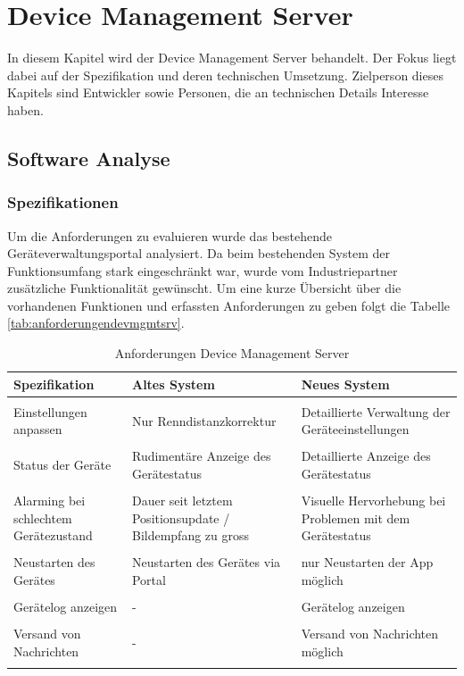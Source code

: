 \chapter{Device Management Server}
\label{sec:devmgmtsrv}
In diesem Kapitel wird der Device Management Server behandelt. Der Fokus liegt dabei auf der Spezifikation und deren technischen Umsetzung. Zielperson dieses Kapitels sind Entwickler sowie Personen, die an technischen Details Interesse haben.

\section{Software Analyse}

\subsection{Spezifikationen}
Um die Anforderungen zu evaluieren wurde das bestehende Geräteverwaltungsportal analysiert. Da beim bestehenden System der Funktionsumfang stark eingeschränkt war, wurde vom Industriepartner zusätzliche Funktionalität gewünscht.
Um eine kurze Übersicht über die vorhandenen Funktionen und erfassten Anforderungen zu geben folgt die Tabelle \ref{tab:anforderungendevmgmtsrv}.

\begin{longtable}{>{\RaggedRight}p{3.5cm} | >{\RaggedRight}p{4.3cm} | >{\RaggedRight}p{4.3cm} }

    \textbf{Spezifikation} & \textbf{Altes System} & \textbf{Neues System} \\ [1ex] \hline \hline & &  \\ [-1.5ex]
    Einstellungen anpassen & Nur Renndistanzkorrektur & Detaillierte Verwaltung der Geräteeinstellungen\\ [1ex] \hline & &  \\ [-1.5ex]
    Status der Geräte & Rudimentäre Anzeige des Gerätestatus & Detaillierte Anzeige des Gerätestatus\\ [1ex] \hline & &  \\ [-1.5ex]
     Alarming bei schlechtem Gerätezustand & Dauer seit letztem Positionsupdate / Bildempfang zu gross & Visuelle Hervorhebung bei Problemen mit dem Gerätestatus \\ [1ex] \hline & &  \\ [-1.5ex]
    Neustarten des Gerätes & Neustarten des Gerätes via Portal & nur Neustarten der App möglich\\ [1ex] \hline & &  \\ [-1.5ex]
    Gerätelog anzeigen & - & Gerätelog anzeigen\\ [1ex] \hline & &  \\ [-1.5ex]
    Versand von Nachrichten & - & Versand von Nachrichten möglich\\ [1ex] 
\caption{Anforderungen Device Management Server}
\end{longtable}
\label{tab:anforderungendevmgmtsrv}

